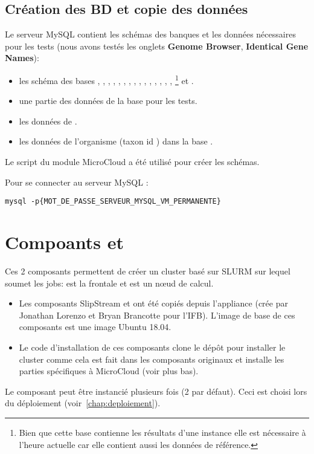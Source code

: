 \subsection{Création des BD et copie des données}

Le serveur MySQL contient les schémas des banques et les données nécessaires pour les tests (nous avons testés les onglets \textbf{Genome Browser}, \textbf{Identical Gene Names}):
\begin{itemize}
    \item les schéma des bases , , , , , , , ,
          , , , , , , , \footnote{Bien que cette base contienne les résultats d'une instance elle est nécessaire à l'heure actuelle car elle contient aussi les données de référence.}
          et .
    \item une partie des données de la base  pour les tests.
    \item les données de .
    \item les données de l'organisme \theOrg{} (taxon id \theTaxID{}) dans la base .
\end{itemize}

Le script  du module MicroCloud a été utilisé pour créer les schémas.

Pour se connecter au serveur MySQL :
\begin{lstlisting}[style=bash]
mysql -p{MOT_DE_PASSE_SERVEUR_MYSQL_VM_PERMANENTE}
\end{lstlisting}

\section{Compoants  et } \label{master&slave}

Ces 2 composants permettent de créer un cluster basé sur SLURM sur lequel  soumet les jobs:
 est la frontale et  est un nœud de calcul.
\begin{itemize}
    \item Les composants SlipStream  et  ont été copiés depuis
    l'appliance \href{https://nuv.la/module/ifb/devzone/jlorenzo/cluster/Slurm_Cluster_ubuntu18}{}
          (crée par Jonathan Lorenzo et Bryan Brancotte pour l'IFB).
          L'image de base de ces composants est une image Ubuntu 18.04.
    \item Le code d'installation de ces composants clone le dépôt  pour installer le cluster
          comme cela est fait dans les composants originaux
          et installe les parties spécifiques à MicroCloud (voir plus bas).
\end{itemize}
Le composant  peut être instancié plusieurs fois (2 par défaut).
Ceci est choisi lors du déploiement (voir~\autoref{chap:deploiement}).

